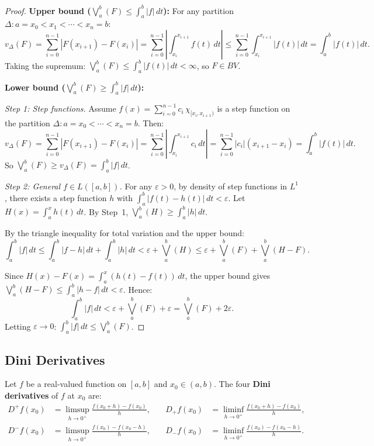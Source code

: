 \documentclass[11pt]{report}
\begin{document}
\begin{proof}
\textbf{Upper bound ($\bigvee_a^b(F) \leq \int_a^b |f|\,dt$):} For any partition $\Delta: a = x_0 < x_1 < \cdots < x_n = b$:
\[
v_\Delta(F) = \sum_{i=0}^{n-1} |F(x_{i+1}) - F(x_i)| = \sum_{i=0}^{n-1} \left|\int_{x_i}^{x_{i+1}} f(t)\,dt\right| \leq \sum_{i=0}^{n-1} \int_{x_i}^{x_{i+1}} |f(t)|\,dt = \int_a^b |f(t)|\,dt.
\]
Taking the supremum: $\bigvee_a^b(F) \leq \int_a^b |f(t)|\,dt < \infty$, so $F \in BV$.

\textbf{Lower bound ($\bigvee_a^b(F) \geq \int_a^b |f|\,dt$):}

\textit{Step 1: Step functions.} Assume $f(x) = \sum_{i=0}^{n-1} c_i\,\chi_{[x_i, x_{i+1})}$ is a step function on the partition $\Delta: a = x_0 < \cdots < x_n = b$. Then:
\[
v_\Delta(F) = \sum_{i=0}^{n-1} |F(x_{i+1}) - F(x_i)| = \sum_{i=0}^{n-1} \left|\int_{x_i}^{x_{i+1}} c_i\,dt\right| = \sum_{i=0}^{n-1} |c_i|(x_{i+1} - x_i) = \int_a^b |f(t)|\,dt.
\]
So $\bigvee_a^b(F) \geq v_\Delta(F) = \int_a^b |f|\,dt$.

\textit{Step 2: General $f \in L([a,b])$.} For any $\varepsilon > 0$, by density of step functions in $L^1$, there exists a step function $h$ with $\int_a^b |f(t) - h(t)|\,dt < \varepsilon$. Let $H(x) = \int_a^x h(t)\,dt$. By Step~1, $\bigvee_a^b(H) \geq \int_a^b |h|\,dt$.

By the triangle inequality for total variation and the upper bound:
\[
\int_a^b |f|\,dt \leq \int_a^b |f - h|\,dt + \int_a^b |h|\,dt < \varepsilon + \bigvee_a^b(H) \leq \varepsilon + \bigvee_a^b(F) + \bigvee_a^b(H - F).
\]

Since $H(x) - F(x) = \int_a^x (h(t) - f(t))\,dt$, the upper bound gives $\bigvee_a^b(H - F) \leq \int_a^b |h - f|\,dt < \varepsilon$. Hence:
\[
\int_a^b |f|\,dt < \varepsilon + \bigvee_a^b(F) + \varepsilon = \bigvee_a^b(F) + 2\varepsilon.
\]
Letting $\varepsilon \to 0$: $\int_a^b |f|\,dt \leq \bigvee_a^b(F)$.
\end{proof}


\subsection{Dini Derivatives}

\begin{defbox}
Let $f$ be a real-valued function on $[a, b]$ and $x_0 \in (a, b)$. The four \textbf{Dini derivatives} of $f$ at $x_0$ are:
\begin{align*}
D^+ f(x_0) &= \limsup_{h \to 0^+} \frac{f(x_0 + h) - f(x_0)}{h}, &\quad D_+ f(x_0) &= \liminf_{h \to 0^+} \frac{f(x_0 + h) - f(x_0)}{h}, \\[4pt]
D^- f(x_0) &= \limsup_{h \to 0^+} \frac{f(x_0) - f(x_0 - h)}{h}, &\quad D_- f(x_0) &= \liminf_{h \to 0^+} \frac{f(x_0) - f(x_0 - h)}{h}.
\end{align*}
\end{defbox}
\end{document}
